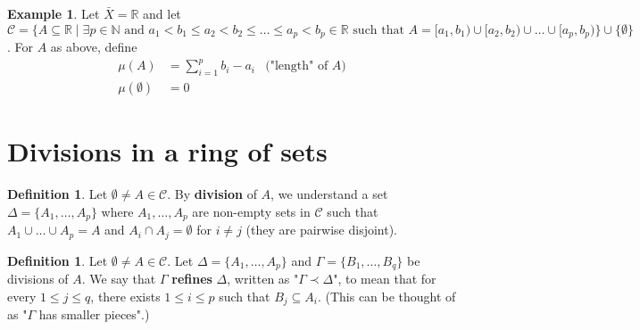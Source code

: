 \documentclass[11pt]{article}
\theoremstyle{definition}
\newtheorem{defn}[thm]{Definition}
\newtheorem{exmp}[thm]{Example}
\newcommand{\N}{\ensuremath{\mathbb{N}}}
\newcommand{\R}{\ensuremath{\mathbb{R}}}
\begin{document}
\begin{exmp}
Let $\bar{X} = \R$ and let $\mathcal{C} = \{A \subseteq \R \mid \exists p \in \N \text{ and } a_1 < b_1 \leq a_2 < b_2 \leq \dots \leq a_p < b_p \in \R \text{ such that } A = [a_1, b_1) \cup [a_2, b_2) \cup \dots \cup [a_p, b_p)\} \cup \{\emptyset\}$. For $A$ as above, define
\begin{align*}
    \mu(A) & = \sum_{i=1}^p b_i - a_i & \text{("length" of $A$)} \\
    \mu(\emptyset) & = 0
\end{align*}
\end{exmp}

\newpage
\section{Divisions in a ring of sets}

\begin{defn}
Let $\emptyset \ne A \in \mathcal{C}$. By {\bf division} of $A$, we understand a set $\Delta = \{A_1, \dots, A_p\}$ where $A_1, \dots, A_p$ are non-empty sets in $\mathcal{C}$ such that $A_1 \cup \dots \cup A_p = A$ and $A_i \cap A_j = \emptyset$ for $i \ne j$ (they are pairwise disjoint). 
\end{defn}

\begin{defn}
Let $\emptyset \ne A \in \mathcal{C}$. Let $\Delta = \{A_1, \dots, A_p\}$ and $\Gamma = \{B_1, \dots, B_q\}$ be divisions of $A$. We say that $\Gamma$ {\bf refines} $\Delta$, written as "$\Gamma \prec \Delta$", to mean that for every $1 \leq j \leq q$, there exists $1 \leq i \leq p$ such that $B_j \subseteq A_i$. (This can be thought of as "$\Gamma$ has smaller pieces".)
\end{defn}
\end{document}
